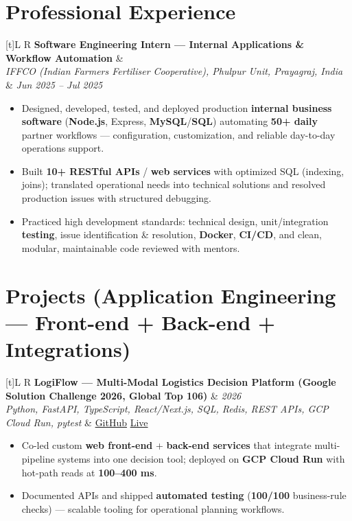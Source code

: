 \documentclass[a4paper,10pt]{article}
\newcommand{\resumeSubheading}[4]{%
  \vspace{0.4mm}
  \noindent
  \begin{tabularx}{\textwidth}[t]{L R}
    \textbf{#1} & #4 \\
    \textit{#3} & \textit{#2} \\
  \end{tabularx}
  \vspace{-0.3mm}%
}
\newcommand{\resumeProject}[4]{%
  \vspace{0.4mm}
  \noindent
  \begin{tabularx}{\textwidth}[t]{L R}
    \textbf{#1} & \textit{#3} \\
    \textit{#2} & #4 \\
  \end{tabularx}
  \vspace{-0.3mm}%
}
\begin{document}
\section{Professional Experience}
\small
\resumeSubheading
  {Software Engineering Intern --- Internal Applications \& Workflow Automation}{Jun 2025 -- Jul 2025}
  {IFFCO (Indian Farmers Fertiliser Cooperative), Phulpur Unit, Prayagraj, India}{}
\begin{itemize}
  \item Designed, developed, tested, and deployed production \textbf{internal business software} (\textbf{Node.js}, Express, \textbf{MySQL}/\textbf{SQL}) automating \textbf{50+ daily} partner workflows --- configuration, customization, and reliable day-to-day operations support.
  \item Built \textbf{10+ RESTful APIs} / \textbf{web services} with optimized SQL (indexing, joins); translated operational needs into technical solutions and resolved production issues with structured debugging.
  \item Practiced high development standards: technical design, unit/integration \textbf{testing}, issue identification \& resolution, \textbf{Docker}, \textbf{CI/CD}, and clean, modular, maintainable code reviewed with mentors.
\end{itemize}

\section{Projects (Application Engineering --- Front-end + Back-end + Integrations)}
\small

\resumeProject
  {LogiFlow --- Multi-Modal Logistics Decision Platform (Google Solution Challenge 2026, Global Top 106)}
  {Python, FastAPI, TypeScript, React/Next.js, SQL, Redis, REST APIs, GCP Cloud Run, pytest}
  {2026}
  {\href{https://github.com/Ojas-Srivastava05/LogiFlow-Solution-Challenge-2026}{GitHub} \textbar{} \href{https://logi-flow-solution-challenge-2026.vercel.app/}{Live}}
\begin{itemize}
  \item Co-led custom \textbf{web front-end} + \textbf{back-end services} that integrate multi-pipeline systems into one decision tool; deployed on \textbf{GCP Cloud Run} with hot-path reads at \textbf{100--400 ms}.
  \item Documented APIs and shipped \textbf{automated testing} (\textbf{100/100} business-rule checks) --- scalable tooling for operational planning workflows.
\end{itemize}
\end{document}

